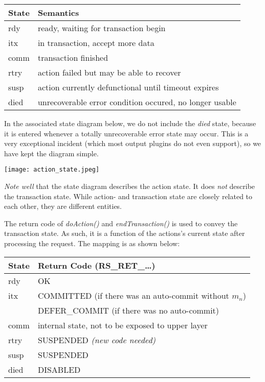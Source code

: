 \documentclass[a4paper,10pt]{article}
\begin{document}
\begin{center}
\begin{tabular}{|l|l|} \hline
	State		& Semantics \\\hline
	rdy 		& ready, waiting for transaction begin\\
	itx		& in transaction, accept more data \\
	comm		& transaction finished \\
	rtry		& action failed but may be able to recover \\
	susp		& action currently defunctional until timeout expires \\
	died		& unrecoverable error condition occured, no longer usable \\\hline
\end{tabular}
\end{center}

In the associated state diagram below, we do not include the \emph{died} state, because it is entered whenever a totally unrecoverable error state may occur. This is a very exceptional incident (which most output plugins do not even support), so we have kept the diagram simple.

\texttt{[image: action\_state.jpeg]}

\emph{Note well} that the state diagram describes the action state. It does \emph{not} describe the transaction state. While action- and transaction state are closely related to each other, they are different entities.

The return code of \emph{doAction()} and \emph{endTransaction()} is used to convey the transaction state. As such, it is a function of the actions's current state after processing the request. The mapping is as shown below:

\begin{center}
\begin{tabular}{|l|l|} \hline
	State		& Return Code (RS\_RET\_\ldots)\\\hline
	rdy 		& OK \\
	itx		& COMMITTED (if there was an auto-commit without $m_n$)\\
			& DEFER\_COMMIT (if there was no auto-commit)\\
	comm		& internal state, not to be exposed to upper layer \\
	rtry		& SUSPENDED \emph{(new code needed)} \\
	susp		& SUSPENDED \\
	died		& DISABLED \\\hline
\end{tabular}
\end{center}
\end{document}
